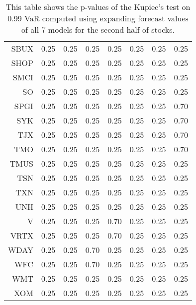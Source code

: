 \begin{table}[ht]
\begin{tabular}{rrrrrrrr}
  SBUX & 0.25 & 0.25 & 0.25 & 0.25 & 0.25 & 0.25 & 0.25 \\ 
  SHOP & 0.25 & 0.25 & 0.25 & 0.25 & 0.25 & 0.25 & 0.25 \\ 
  SMCI & 0.25 & 0.25 & 0.25 & 0.25 & 0.25 & 0.25 & 0.25 \\ 
  SO & 0.25 & 0.25 & 0.25 & 0.25 & 0.25 & 0.25 & 0.25 \\ 
  SPGI & 0.25 & 0.25 & 0.25 & 0.25 & 0.25 & 0.25 & 0.70 \\ 
  SYK & 0.25 & 0.25 & 0.25 & 0.25 & 0.25 & 0.25 & 0.70 \\ 
  TJX & 0.25 & 0.25 & 0.25 & 0.25 & 0.25 & 0.25 & 0.70 \\ 
  TMO & 0.25 & 0.25 & 0.25 & 0.25 & 0.25 & 0.25 & 0.70 \\ 
  TMUS & 0.25 & 0.25 & 0.25 & 0.25 & 0.25 & 0.25 & 0.25 \\ 
  TSN & 0.25 & 0.25 & 0.25 & 0.25 & 0.25 & 0.25 & 0.25 \\ 
  TXN & 0.25 & 0.25 & 0.25 & 0.25 & 0.25 & 0.25 & 0.25 \\ 
  UNH & 0.25 & 0.25 & 0.25 & 0.25 & 0.25 & 0.25 & 0.25 \\ 
  V & 0.25 & 0.25 & 0.25 & 0.70 & 0.25 & 0.25 & 0.25 \\ 
  VRTX & 0.25 & 0.25 & 0.25 & 0.70 & 0.25 & 0.25 & 0.25 \\ 
  WDAY & 0.25 & 0.25 & 0.70 & 0.25 & 0.25 & 0.25 & 0.25 \\ 
  WFC & 0.25 & 0.25 & 0.70 & 0.25 & 0.25 & 0.25 & 0.25 \\ 
  WMT & 0.25 & 0.25 & 0.25 & 0.25 & 0.25 & 0.25 & 0.25 \\ 
  XOM & 0.25 & 0.25 & 0.25 & 0.25 & 0.25 & 0.25 & 0.25 \\ 
   \hline
\end{tabular}
\caption[Kupiec's test p-values, alpha =0.99 (2)]{This table shows the p-values of the Kupiec's test on 0.99 VaR computed using expanding forecast values of all 7 models for the second half of stocks.} 
\label{Table:Kupiec_test_expanding_0.99_2}
\end{table}
